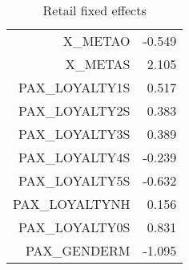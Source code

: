 \documentclass{article}
\begin{document}
\begin{table}[H]
\begin{tabular}{rr}
	X\_METAO	                     &      -0.549            \\         
	X\_METAS	                     &      2.105             \\        
	PAX\_LOYALTY1S    	     &      0.517             \\        
	PAX\_LOYALTY2S    	     &       0.383            \\         
	PAX\_LOYALTY3S    	     &       0.389            \\         
	PAX\_LOYALTY4S    	     &       -0.239           \\          
	PAX\_LOYALTY5S    	     &       -0.632           \\          
	PAX\_LOYALTYNH    	     &        0.156           \\          
	PAX\_LOYALTY0S	             &        0.831           \\          
	PAX\_GENDERM	             &       -1.095           \\
	\hline 
	\hline   
\end{tabular}  
\caption{Retail fixed effects } 
\end{table}
\end{document}
